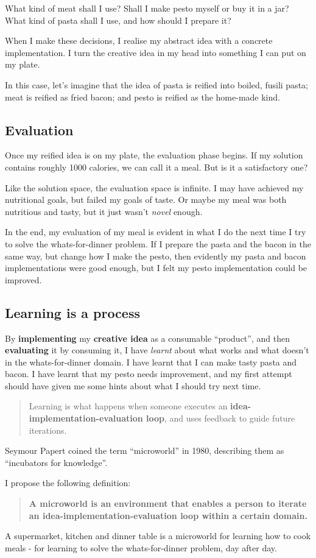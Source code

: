 What kind of meat shall I use? Shall I make pesto myself or buy it in a jar?
What kind of pasta shall I use, and how should I prepare it?

When I make these decisions, I realise my abstract idea
with a concrete implementation. I turn the creative idea in my head
into something I can put on my plate. 

In this case, let's imagine that the idea of pasta is reified into boiled, fusili pasta; meat is reified as fried bacon; and pesto is reified as the home-made kind. 

\subsection{Evaluation}

Once my reified idea is on my plate, the evaluation phase begins. If my
solution contains roughly 1000 calories, we can call it a meal. But is
it a satisfactory one?

Like the solution space, the evaluation space is infinite. I may have
achieved my nutritional goals, but failed my goals of taste. Or maybe my
meal was both nutritious and tasty, but it just wasn't \emph{novel}
enough.

In the end, my evaluation of my meal is evident in what I do the next time I try to solve the whats-for-dinner problem. If I prepare the pasta and the bacon in the same way, but change how I make the pesto, then evidently my pasta and bacon implementations were good enough, but I felt my pesto implementation could be improved. 

\subsection{Learning is a process}

By \textbf{implementing} my \textbf{creative idea} as a consumable ``product'', and then \textbf{evaluating} it by consuming it, I have \textit{learnt} about what works and what doesn't in the whats-for-dinner domain. I have learnt that I can make tasty pasta and bacon. I have learnt that my pesto needs improvement, and my first attempt should have given me some hints about what I should try next time. 

\begin{quote}
  Learning is what happens when someone executes an
  \textbf{idea-implementation-evaluation loop}, and uses feedback to guide future
  iterations.
\end{quote}

Seymour Papert coined the term ``microworld'' in 1980, describing them as ``incubators for knowledge''\cite[p120]{mindstorms}.

I propose the following definition:

\begin{quote}
  \textbf{A microworld is an environment that enables a person to iterate
  an idea-implementation-evaluation loop within a certain domain.}
\end{quote}

A supermarket, kitchen and dinner table is a microworld for learning how to cook meals - for learning to solve the whats-for-dinner problem, day after day.
